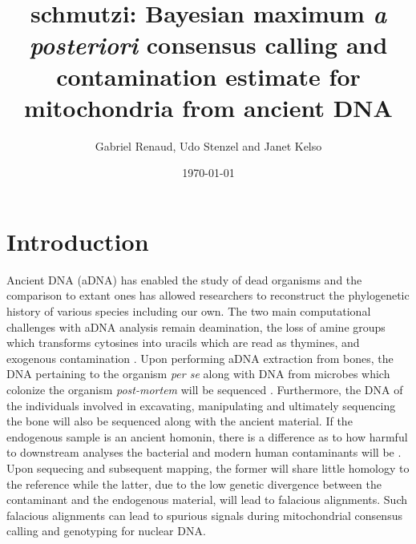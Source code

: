 \documentclass[a4paper,12pt]{article}
\begin{document}


\title{schmutzi: Bayesian maximum {\it a posteriori} consensus calling and contamination estimate for mitochondria from ancient DNA }
\date{\today}
\author{Gabriel Renaud, Udo Stenzel and Janet Kelso}


\maketitle
\tableofcontents
\section{Introduction}

Ancient DNA (aDNA) has enabled the study of dead organisms and the comparison to extant ones has allowed researchers to reconstruct the phylogenetic history of various species including our own. The two main computational challenges with aDNA analysis remain deamination, the loss of amine groups which transforms cytosines into uracils which are read as thymines, and exogenous contamination \cite{briggs2007patterns}. Upon performing aDNA extraction from bones, the DNA pertaining to the organism {\it per se} along with DNA from microbes which colonize the organism {\it post-mortem} will be sequenced \cite{sidow1991bacterial,handt1994ancient}. Furthermore, the DNA of the individuals involved in excavating, manipulating and ultimately sequencing the bone will also be sequenced along with the ancient material. If the endogenous sample is an ancient homonin, there is a difference as to how harmful to downstream analyses the bacterial and modern human contaminants will be . Upon sequecing and subsequent mapping, the former will share little homology to the reference while the latter, due to the low genetic divergence between the contaminant and the endogenous material, will lead to falacious alignments. Such falacious alignments can lead to spurious signals during mitochondrial consensus calling and genotyping for nuclear DNA. 
\end{document}

